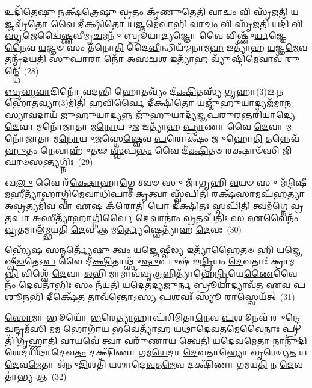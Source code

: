𑌉𑌦𑌿᳴𑌤𑍇\-\ul{𑌷𑍁} 𑌨𑌕𑍍𑌷᳴𑌤𑍍𑌰𑍇𑌷𑍁 \ul{𑌵𑍍𑌰}\-𑌤𑌂 𑌕𑍃᳴\-\ul{𑌣𑍁}\-𑌤𑍇\-\ul{𑌤𑌿} 𑌵𑌾\-\ul{𑌚𑌂} 𑌵𑌿 𑌸𑍃᳴𑌜𑌤𑌿 \ul{𑌯}\-𑌜𑍍𑌞𑌵𑍍𑌰᳴\-\ul{𑌤𑍋} 𑌵𑍈 𑌦𑍀॑\-\ul{𑌕𑍍𑌷𑌿}\-𑌤𑍋 \ul{𑌯}\-𑌜𑍍𑌞\-\ul{𑌮𑍇}\-𑌵𑌾𑌭𑌿 𑌵𑌾\-\ul{𑌚𑌂} 𑌵𑌿 𑌸𑍃᳴𑌜\-\ul{𑌤𑌿} 𑌯𑌦𑌿᳴ 𑌵𑌿\-\ul{𑌸𑍃}\-𑌜𑍇𑌦𑍍𑌵𑍈॑\-\ul{𑌷𑍍𑌣}\-𑌵𑍀𑌮𑍃\-\ul{𑌚}\-𑌮𑌨𑍁᳴ 𑌬𑍍𑌰𑍂𑌯𑌾\-\ul{𑌦𑍍𑌯}\-𑌜𑍍𑌞𑍋 𑌵𑍈 𑌵𑌿𑌷𑍍𑌣𑍁᳴\-\ul{𑌰𑍍𑌯}\-𑌜𑍍𑌞𑍇\-\ul{𑌨𑍈}\-𑌵 \ul{𑌯}\-𑌜𑍍𑌞𑍞 𑌸𑌂 𑌤᳴𑌨𑍋\-\ul{𑌤𑌿} 𑌦𑍈\-\ul{𑌵𑍀}\-𑌨𑍍𑌧𑌿𑌯᳴𑌮𑍍𑌮𑌨𑌾𑌮\-\ul{𑌹} 𑌇𑌤𑍍𑌯𑌾᳴𑌹 \ul{𑌯}\-𑌜𑍍𑌞\-\ul{𑌮𑍇}\-𑌵 𑌤𑌨𑍍𑌮𑍍𑌰᳴𑌦𑌯𑌤𑌿 𑌸𑍁\-\ul{𑌪𑌾}\-𑌰𑌾 𑌨𑍋᳴ 𑌅\-\ul{𑌸}\-𑌦𑍍𑌵\-\ul{𑌶} 𑌇𑌤𑍍𑌯𑌾᳴\-\ul{𑌹} 𑌵𑍍𑌯𑍁᳴𑌷𑍍𑌟𑌿\-\ul{𑌮𑍇}\-𑌵𑌾𑌵᳴ 𑌰𑍁𑌨𑍍𑌦𑍍𑌧𑍇~(28)

\-\ul{𑌬𑍍𑌰}\-\-\ul{𑌹𑍍𑌮}\-\-\ul{𑌵𑌾}\-𑌦𑌿𑌨𑍋᳴ 𑌵𑌦𑌨𑍍𑌤𑌿 𑌹𑍋\-\ul{𑌤}\-𑌵𑍍𑌯𑌂᳴ 𑌦𑍀\-\ul{𑌕𑍍𑌷𑌿}\-𑌤𑌸𑍍𑌯᳴ \ul{𑌗𑍃}\-𑌹𑌾(3)𑌇 𑌨 𑌹𑍋᳴\-\ul{𑌤}\-𑌵𑍍𑌯𑌾(3)𑌮𑌿𑌤𑌿᳴ \ul{𑌹}\-𑌵𑌿𑌰𑍍𑌵𑍈 𑌦𑍀॑\-\ul{𑌕𑍍𑌷𑌿}\-𑌤𑍋 𑌯𑌜𑍍𑌜𑍁᳴\-\ul{𑌹𑍁}\-𑌯𑌾𑌦𑍍𑌯𑌜᳴𑌮𑌾𑌨𑌸𑍍𑌯𑌾\-\ul{𑌵}\-𑌦𑌾𑌯᳴ 𑌜𑍁𑌹𑍁\-\ul{𑌯𑌾}\-𑌦𑍍𑌯𑌨𑍍𑌨 𑌜𑍁᳴\-\ul{𑌹𑍁}\-𑌯𑌾𑌦𑍍𑌯᳴𑌜𑍍𑌞\-\ul{𑌪}\-𑌰𑍁\-\ul{𑌰}\-𑌨𑍍𑌤𑌰𑌿᳴\-\ul{𑌯𑌾}\-𑌦𑍍𑌯𑍇 \ul{𑌦𑍇}\-𑌵𑌾 𑌮𑌨𑍋᳴𑌜𑌾𑌤𑌾 𑌮\-\ul{𑌨𑍋}\-𑌯𑍁\-\ul{𑌜} 𑌇𑌤𑍍𑌯𑌾᳴𑌹 \ul{𑌪𑍍𑌰𑌾}\-𑌣𑌾 𑌵𑍈 \ul{𑌦𑍇}\-𑌵𑌾 𑌮𑌨𑍋᳴𑌜𑌾𑌤𑌾 𑌮\-\ul{𑌨𑍋}\-𑌯𑍁\-\ul{𑌜}\-𑌸𑍍𑌤𑍇\-\ul{𑌷𑍍𑌵𑍇}\-𑌵 \ul{𑌪}\-𑌰𑍋𑌕𑍍𑌷𑌂᳴ 𑌜𑍁𑌹𑍋\-\ul{𑌤𑌿} 𑌤𑌨𑍍𑌨𑍇𑌵᳴ \ul{𑌹𑍁}\-𑌤𑌂 𑌨𑍇𑌵𑌾𑌹𑍁᳴𑌤𑍟 \ul{𑌸𑍍𑌵}\-𑌪\-\ul{𑌨𑍍𑌤𑌂} 𑌵𑍈 𑌦𑍀॑\-\ul{𑌕𑍍𑌷𑌿}\-𑌤𑍞 𑌰𑌕𑍍𑌷𑌾𑍞᳴𑌸𑌿 𑌜𑌿𑌘𑌾𑍞𑌸\-\ul{𑌨𑍍𑌤𑍍𑌯}\-𑌗𑍍𑌨𑌿𑌃~(29)

𑌖\-\ul{𑌲𑍁} 𑌵𑍈 𑌰᳴\-\ul{𑌕𑍍𑌷𑍋}\-𑌹𑌾\-\ul{𑌗𑍍𑌨𑍇} 𑌤𑍍𑌵𑍞 𑌸𑍁 𑌜𑌾᳴𑌗𑍃𑌹𑌿 \ul{𑌵}\-𑌯𑍞 𑌸𑍁 𑌮᳴𑌨𑍍𑌦𑌿𑌷𑍀\-\ul{𑌮}\-𑌹𑍀𑌤𑍍𑌯𑌾᳴\-\ul{𑌹𑌾}\-𑌗𑍍𑌨𑌿\-\ul{𑌮𑍇}\-𑌵𑌾\-\ul{𑌧𑌿}\-𑌪𑌾𑌂 \ul{𑌕𑍃}\-𑌤𑍍𑌵𑌾 𑌸𑍍𑌵᳴𑌪𑌿\-\ul{𑌤𑌿} 𑌰𑌕𑍍𑌷᳴\-\ul{𑌸𑌾}\-𑌮𑌪᳴𑌹𑌤𑍍𑌯𑌾 𑌅\-\ul{𑌵𑍍𑌰}\-𑌤𑍍𑌯𑌮𑌿᳴\-\ul{𑌵} 𑌵𑌾 \ul{𑌏}\-𑌷 𑌕᳴𑌰𑍋\-\ul{𑌤𑌿} 𑌯𑍋 𑌦𑍀॑\-\ul{𑌕𑍍𑌷𑌿}\-𑌤𑌃 𑌸𑍍𑌵𑌪𑌿᳴\-\ul{𑌤𑌿} 𑌤𑍍𑌵𑌮᳴𑌗𑍍𑌨𑍇 𑌵𑍍𑌰\-\ul{𑌤}\-𑌪𑌾 \ul{𑌅}\-𑌸𑍀𑌤𑍍𑌯𑌾᳴\-\ul{𑌹𑌾}\-𑌗𑍍𑌨𑌿𑌰𑍍𑌵𑍈 \ul{𑌦𑍇}\-𑌵𑌾𑌨𑌾𑌂॑ \ul{𑌵𑍍𑌰}\-𑌤𑌪᳴\-\ul{𑌤𑌿𑌃} 𑌸 \ul{𑌏}\-𑌵𑍈𑌨𑌂᳴ \ul{𑌵𑍍𑌰}\-𑌤𑌮𑌾𑌲᳴𑌮𑍍𑌭𑌯𑌤𑌿 \ul{𑌦𑍇}\-𑌵 𑌆 𑌮\-\ul{𑌰𑍍𑌤𑍍𑌯𑍇}\-𑌷𑍍𑌵𑍇𑌤𑍍𑌯𑌾᳴𑌹 \ul{𑌦𑍇}\-𑌵𑌃~(30)

𑌹𑍍𑌯𑍇᳴𑌷 𑌸𑌨𑍍𑌮𑌰𑍍𑌤𑍍𑌯𑍇᳴\-\ul{𑌷𑍁} 𑌤𑍍𑌵𑌂 \ul{𑌯}\-𑌜𑍍𑌞𑍇𑌷𑍍𑌵𑍀\-\ul{𑌡𑍍𑌯} 𑌇𑌤𑍍𑌯𑌾᳴\-\ul{𑌹𑍈}\-𑌤𑍞 𑌹𑌿 \ul{𑌯}\-𑌜𑍍𑌞𑍇𑌷𑍍𑌵𑍀\-\ul{𑌡}\-𑌤𑍇\-𑌽\-\ul{𑌪} 𑌵𑍈 𑌦𑍀॑\-\ul{𑌕𑍍𑌷𑌿}\-𑌤𑌾𑌥𑍍𑌸𑍁᳴\-\ul{𑌷𑍁}\-𑌪𑍁𑌷᳴ 𑌇\-\ul{𑌨𑍍𑌦𑍍𑌰𑌿}\-𑌯𑌂 \ul{𑌦𑍇}\-𑌵𑌤𑌾𑌃॑ 𑌕𑍍𑌰𑌾𑌮\-\ul{𑌨𑍍𑌤𑌿} 𑌵𑌿𑌶𑍍𑌵𑍇᳴ \ul{𑌦𑍇}\-𑌵𑌾 \ul{𑌅}\-𑌭𑌿 𑌮𑌾𑌮𑌾𑌵᳴𑌵𑍃\-\ul{𑌤𑍍𑌰}\-𑌨𑍍𑌨𑌿𑌤𑍍𑌯𑌾᳴𑌹𑍇\-\ul{𑌨𑍍𑌦𑍍𑌰𑌿}\-𑌯𑍇\-\ul{𑌣𑍈}\-𑌵𑍈𑌨𑌂᳴ \ul{𑌦𑍇}\-𑌵𑌤𑌾᳴\-\ul{𑌭𑌿𑌃} 𑌸𑌂 𑌨᳴𑌯\-\ul{𑌤𑌿} 𑌯\-\ul{𑌦𑍇}\-𑌤𑌦𑍍𑌯\-\ul{𑌜𑍁}\-𑌰𑍍𑌨 \ul{𑌬𑍍𑌰𑍂}\-𑌯𑌾𑌦𑍍𑌯𑌾𑌵᳴𑌤 \ul{𑌏}\-𑌵 \ul{𑌪}\-𑌶𑍂\-\ul{𑌨}\-𑌭𑌿 𑌦𑍀𑌕𑍍𑌷𑍇᳴\-\ul{𑌤} 𑌤𑌾𑌵᳴𑌨𑍍𑌤𑍋\-𑌽𑌸𑍍𑌯 \ul{𑌪}\-𑌶𑌵𑌃᳴ \ul{𑌸𑍍𑌯𑍂} 𑌰𑌾𑌸𑍍𑌵𑍇𑌯᳴𑌤𑍍~(31)

\-\ul{𑌸𑍋}\-𑌮𑌾 𑌭𑍂𑌯𑍋᳴ \ul{𑌭}\-𑌰𑍇\-\ul{𑌤𑍍𑌯𑌾}\-𑌹𑌾𑌪᳴𑌰𑌿𑌮𑌿𑌤𑌾\-\ul{𑌨𑍇}\-𑌵 \ul{𑌪}\-𑌶𑍂𑌨𑌵᳴ 𑌰𑍁𑌨𑍍𑌦𑍍𑌧𑍇 \ul{𑌚}\-𑌨𑍍𑌦𑍍𑌰𑌮᳴\-\ul{𑌸𑌿} 𑌮\-\ul{𑌮} 𑌭𑍋𑌗𑌾᳴𑌯 \ul{𑌭}\-𑌵𑍇𑌤𑍍𑌯𑌾᳴𑌹 𑌯𑌥𑌾𑌦𑍇\-\ul{𑌵}\-𑌤\-\ul{𑌮𑍇}\-𑌵𑍈\-\ul{𑌨𑌾𑌃} 𑌪𑍍𑌰𑌤𑌿᳴ 𑌗𑍃𑌹𑍍𑌣𑌾𑌤𑌿 \ul{𑌵𑌾}\-𑌯𑌵𑍇॑ \ul{𑌤𑍍𑌵𑌾} 𑌵𑌰𑍁᳴𑌣𑌾\-\ul{𑌯} 𑌤𑍍𑌵𑍇\-\ul{𑌤𑌿} 𑌯\-\ul{𑌦𑍇}\-𑌵\-\ul{𑌮𑍇}\-𑌤𑌾 𑌨𑌾𑌨𑍁᳴\-\ul{𑌦𑌿}\-𑌶𑍇𑌦𑌯᳴𑌥𑌾𑌦𑍇𑌵\-\ul{𑌤𑌂} 𑌦𑌕𑍍𑌷𑌿᳴𑌣𑌾 𑌗𑌮\-\ul{𑌯𑍇}\-𑌦𑌾 \ul{𑌦𑍇}\-𑌵𑌤𑌾॑𑌭𑍍𑌯𑍋 𑌵𑍃𑌶𑍍𑌚𑍍𑌯𑍇\-\ul{𑌤} 𑌯\-\ul{𑌦𑍇}\-𑌵\-\ul{𑌮𑍇}\-𑌤𑌾 𑌅᳴𑌨𑍁\-\ul{𑌦𑌿}\-𑌶𑌤𑌿᳴ 𑌯𑌥𑌾𑌦𑍇\-\ul{𑌵}\-𑌤\-\ul{𑌮𑍇}\-𑌵 𑌦𑌕𑍍𑌷𑌿᳴𑌣𑌾 𑌗𑌮𑌯\-\ul{𑌤𑌿} 𑌨 \ul{𑌦𑍇}\-𑌵𑌤𑌾॑\-\ul{𑌭𑍍𑌯} 𑌆~(32)

